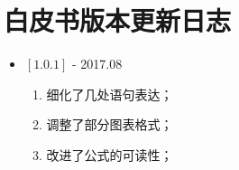 \section{白皮书版本更新日志}
\begin{itemize}
\item $[1.0.1]$ - 2017.08
\begin{enumerate}
\item 细化了几处语句表达；
\item 调整了部分图表格式；
\item 改进了公式的可读性；
\end{enumerate}
\end{itemize}
